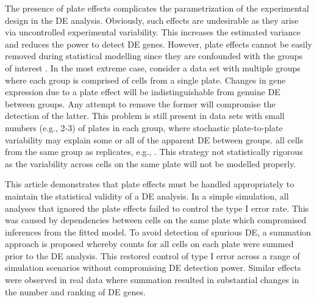 \documentclass[oupdraft]{bio}
\begin{document}
The presence of plate effects complicates the parametrization of the experimental design in the DE analysis.
Obviously, such effects are undesirable as they arise via uncontrolled experimental variability.
This increases the estimated variance and reduces the power to detect DE genes.
However, plate effects cannot be easily removed during statistical modelling since they are confounded with the groups of interest \citep{hicks2015widespread}.
In the most extreme case, consider a data set with multiple groups where each group is comprised of cells from a single plate.
Changes in gene expression due to a plate effect will be indistinguishable from genuine DE between groups.
Any attempt to remove the former will compromise the detection of the latter.
This problem is still present in data sets with small numbers (e.g., 2-3) of plates in each group, 
    where stochastic plate-to-plate variability may explain some or all of the apparent DE between groups.
 all cells from the same group as replicates, e.g., \cite{kolod2015single}.
This strategy  not statistically rigorous as the variability across cells on the same plate will not be modelled properly.


This article demonstrates that plate effects must be handled appropriately to maintain the statistical validity of a DE analysis.
In a simple simulation, all analyses that ignored the plate effects failed to control the type I error rate.
This was caused by dependencies between cells on the same plate which compromised inferences from the fitted model.
To avoid detection of spurious DE, a summation approach is proposed whereby counts for all cells on each plate were summed prior to the DE analysis.
This restored control of type I error across a range of simulation scenarios without compromising DE detection power.
Similar effects were observed in real data where summation resulted in substantial changes in the number and ranking of DE genes.
\end{document}
